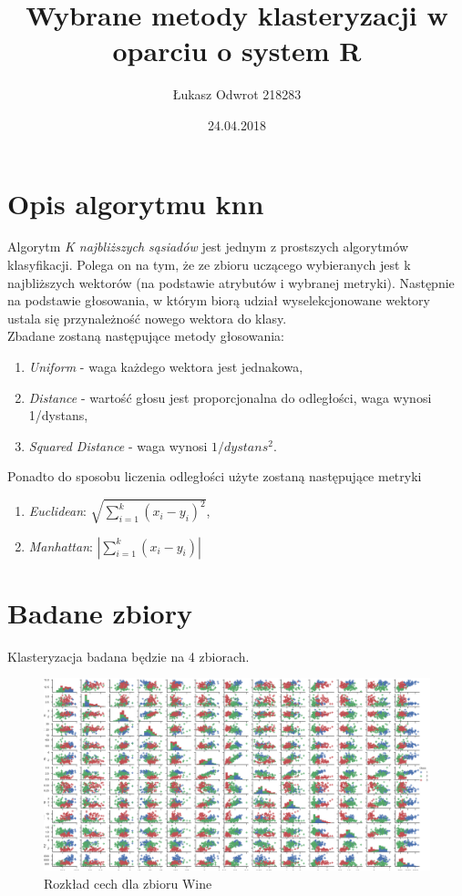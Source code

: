 \documentclass[12pt,a4paper]{article}
\title{Wybrane metody klasteryzacji w oparciu o system R}
\date{24.04.2018}
\author{Łukasz Odwrot 218283}
\begin{document}
\maketitle
\thispagestyle{empty}
\newpage
\tableofcontents
\setcounter{page}{1}
\newpage

\section{Opis algorytmu knn}
Algorytm \textit{K najbliższych sąsiadów} jest jednym z prostszych algorytmów klasyfikacji. Polega on na tym, że ze zbioru uczącego wybieranych jest k najbliższych wektorów (na podstawie atrybutów i wybranej metryki). Następnie na podstawie głosowania, w którym biorą udział wyselekcjonowane wektory ustala się przynależność nowego wektora do klasy.\\
Zbadane zostaną następujące metody głosowania:
\begin{enumerate}
  \item \textit{Uniform} - waga każdego wektora jest jednakowa,
  \item \textit{Distance} - wartość głosu jest proporcjonalna do odległości, waga wynosi 1/dystans,
  \item \textit{Squared Distance} - waga wynosi $1/dystans^2$.
\end{enumerate}

Ponadto do sposobu liczenia odległości użyte zostaną następujące metryki

\begin{enumerate}
  \item \textit{Euclidean}: $\sqrt{\sum_{i=1}^k(x_i - y_i)^2} $,
  \item \textit{Manhattan}: $|\sum_{i=1}^k(x_i - y_i)| $
\end{enumerate}


\section{Badane zbiory}

Klasteryzacja badana będzie na 4 zbiorach.
\begin{figure}[H]
\centering
\includegraphics[width=1\textwidth]{dsWineCombined.png}
\caption{Rozkład cech dla zbioru Wine}
\end{figure}
\end{document}
